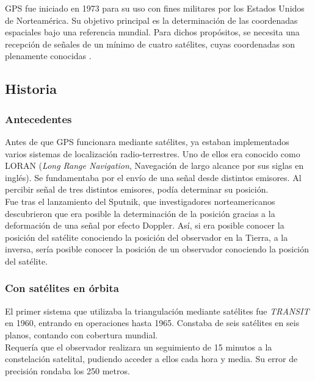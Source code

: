 
GPS fue iniciado en 1973 para su uso con fines militares por los Estados Unidos de Norteamérica. Su objetivo principal es la determinación de las coordenadas espaciales bajo una referencia mundial. Para dichos propósitos, se necesita una recepción de señales de un mínimo de cuatro satélites, cuyas coordenadas son plenamente conocidas \citep{huerta2005gps}.

\subsection{Historia}

\subsubsection{Antecedentes}
Antes de que GPS funcionara mediante satélites, ya estaban implementados varios sistemas de localización radio-terrestres. Uno de ellos era conocido como LORAN (\textit{Long Range Navigation}, Navegación de largo alcance por sus siglas en inglés). Se fundamentaba por el envío de una señal desde distintos emisores. Al percibir señal de tres distintos emisores, podía determinar su posición. \\

Fue tras el lanzamiento del Sputnik\footnotemark, que investigadores norteamericanos descubrieron que era posible la determinación de la posición gracias a la deformación de una señal por efecto Doppler. Así, si era posible conocer la posición del satélite conociendo la posición del observador en la Tierra, a la inversa, sería posible conocer la posición de un observador conociendo la posición del satélite.


\subsubsection{Con satélites en órbita}
El primer sistema que utilizaba la triangulación mediante satélites fue \textit{TRANSIT} en 1960, entrando en operaciones hasta 1965. Constaba de seis satélites en seis planos, contando con cobertura mundial. \\

Requería que el observador realizara un seguimiento de 15 minutos a la constelación satelital, pudiendo acceder a ellos cada hora y media. Su error de precisión rondaba los 250 metros.\\

